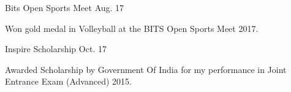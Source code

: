 

\begin{cventries}

  \cventrynotitle
    {Bits Open Sports Meet} %
    {Aug. 17}
    {
      \begin{cvdesc}
      Won gold medal in Volleyball at the BITS Open Sports Meet 2017.
      \end{cvdesc}
    }

  \cventrynotitle
    {Inspire Scholarship} %
    {Oct. 17}
    {
      \begin{cvdesc}
      Awarded Scholarship by Government Of India for my performance in Joint Entrance Exam (Advanced) 2015.
      \end{cvdesc}
    }

\end{cventries}
